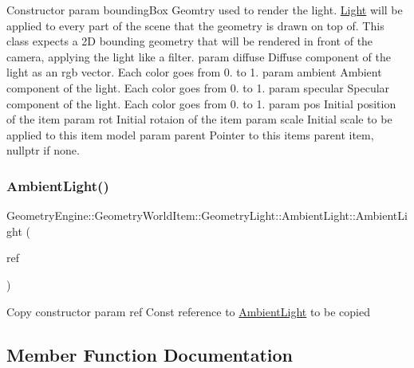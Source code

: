 Constructor param bounding\+Box Geomtry used to render the light. \mbox{\hyperlink{class_geometry_engine_1_1_geometry_world_item_1_1_geometry_light_1_1_light}{Light}} will be applied to every part of the scene that the geometry is drawn on top of. This class expects a 2D bounding geometry that will be rendered in front of the camera, applying the light like a filter. param diffuse Diffuse component of the light as an rgb vector. Each color goes from 0. to 1. param ambient Ambient component of the light. Each color goes from 0. to 1. param specular Specular component of the light. Each color goes from 0. to 1. param pos Initial position of the item param rot Initial rotaion of the item param scale Initial scale to be applied to this item model param parent Pointer to this items parent item, nullptr if none. \mbox{\label{class_geometry_engine_1_1_geometry_world_item_1_1_geometry_light_1_1_ambient_light_a7fd9257e58a7e3d41561f95f7bb383bf}} 
\subsubsection{\texorpdfstring{AmbientLight()}{AmbientLight()}\hspace{0.1cm}{\footnotesize\ttfamily [2/2]}}
{\footnotesize\ttfamily Geometry\+Engine\+::\+Geometry\+World\+Item\+::\+Geometry\+Light\+::\+Ambient\+Light\+::\+Ambient\+Light (\begin{DoxyParamCaption}\item[{const \mbox{\hyperlink{class_geometry_engine_1_1_geometry_world_item_1_1_geometry_light_1_1_ambient_light}{Ambient\+Light}} \&}]{ref }\end{DoxyParamCaption})\hspace{0.3cm}{\ttfamily [inline]}}

Copy constructor param ref Const reference to \mbox{\hyperlink{class_geometry_engine_1_1_geometry_world_item_1_1_geometry_light_1_1_ambient_light}{Ambient\+Light}} to be copied 

\subsection{Member Function Documentation}
\mbox{\label{class_geometry_engine_1_1_geometry_world_item_1_1_geometry_light_1_1_ambient_light_a4f1d4fb9ad25626e15c28de03b610b4f}} 
